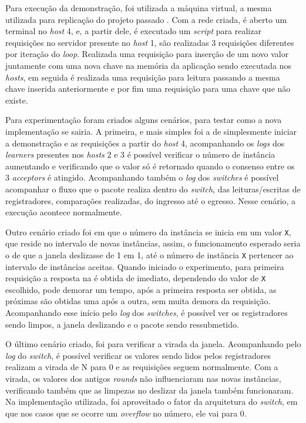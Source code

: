 \documentclass[
    12pt,
    openright, 
    oneside,
    a4paper,
    french,
    english,
    brazil
    ]{facom-ufu-abntex2}
\theoremstyle{definition}
\begin{document}
Para execução da demonstração, foi utilizada a máquina virtual, a mesma utilizada para replicação do projeto
passado \cite{dang2016paxos}. Com a rede criada, é aberto um terminal no \emph{host} 4, e, a partir dele,
é executado um \emph{script} para realizar requisições no servidor presente no \emph{host} 1, são realizadas
3 requisições diferentes por iteração do \emph{loop}. Realizada uma requisição para inserção de um novo valor juntamente
com uma nova chave na memória da aplicação sendo executada nos \emph{hosts}, em seguida é realizada uma requisição para 
leitura passando a mesma chave inserida anteriormente e por fim uma requisição para uma chave que não existe.

Para experimentação foram criados alguns cenários, para testar como a nova implementação se sairia. A primeira, e mais simples
foi a de simplesmente iniciar a demonstração e as requisições a partir do \emph{host} 4, acompanhando os \emph{logs} dos
\emph{learners} presentes nos \emph{hosts} 2 e 3 é possível verificar o número de instância aumentando e verificando que 
o valor só é retornado quando o consenso entre os 3 \emph{acceptors} é atingido. Acompanhando também o \emph{log} dos
\emph{switches} é possível acompanhar o fluxo que o pacote realiza dentro do \emph{switch}, das leituras/escritas de registradores,
comparações realizadas, do ingresso até o egresso. Nesse cenário, a execução acontece normalmente.

Outro cenário criado foi em que o número da instância se inicia em um valor \texttt{X}, que reside no intervalo de novas instâncias,
assim, o funcionamento esperado seria o de que a janela deslizasse de 1 em 1, até o número de instância \texttt{X} pertencer ao intervalo
de instâncias aceitas. Quando iniciado o experimento, para primeira requisição a resposta na é obtida de imediato, dependendo do valor de
\texttt{X} escolhido, pode demorar um tempo, após a primeira resposta ser obtida, as próximas são obtidas uma após a outra, sem muita 
demora da requisição. Acompanhando esse início pelo \emph{log} dos \emph{switches}, é possível ver os registradores sendo limpos,
a janela deslizando e o pacote sendo ressubmetido.

O último cenário criado, foi para verificar a virada da janela. Acompanhando pelo \emph{log} do \emph{switch}, é possível
verificar os valores sendo lidos pelos registradores realizam a virada de N para 0 e as requisições seguem normalmente.
Com a virada, os valores dos antigos \emph{rounds} não influenciaram nas novas instâncias, verificando também que as limpezas
no deslizar da janela também funcionaram. Na implementação utilizada, foi aproveitado o fator da arquitetura do \emph{switch},
em que nos casos que se ocorre um \emph{overflow} no número, ele vai para 0.
\end{document}
